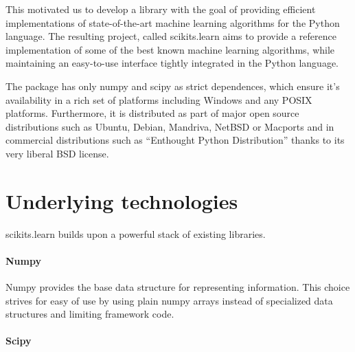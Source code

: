 \documentclass[twoside,11pt]{article}
\begin{document}


This motivated us to develop a library with the goal of providing
efficient implementations of state-of-the-art machine learning
algorithms for the Python language. The resulting project, called
scikits.learn aims to provide a reference implementation of some of
the best known machine learning algorithms, while maintaining an
easy-to-use interface tightly integrated in the Python language.


The package has only numpy and scipy as strict dependences, which ensure
it's availability in a rich set of platforms including
Windows and any POSIX platforms. Furthermore, it is distributed as part of
major open source distributions such as Ubuntu, Debian, Mandriva, NetBSD
or Macports and in commercial distributions such as ``Enthought Python
Distribution'' thanks to its very liberal BSD license.



\section{Underlying technologies}


scikits.learn builds upon a powerful stack of existing libraries.

\paragraph{Numpy}

Numpy provides the base data structure for representing
information. This choice strives for easy of use by using plain numpy
arrays instead of specialized data structures and limiting framework
code.

\paragraph{Scipy} 
\end{document}
